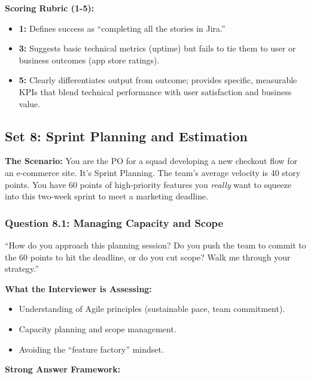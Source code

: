 \textbf{Scoring Rubric (1-5):}

\begin{itemize}
\tightlist
\item
  \textbf{1:} Defines success as ``completing all the stories in Jira.''
\item
  \textbf{3:} Suggests basic technical metrics (uptime) but fails to tie
  them to user or business outcomes (app store ratings).
\item
  \textbf{5:} Clearly differentiates output from outcome; provides
  specific, measurable KPIs that blend technical performance with user
  satisfaction and business value.
\end{itemize}

\bigskip

\subsection{Set 8: Sprint Planning and
Estimation}\label{set-8-sprint-planning-and-estimation}

\textbf{The Scenario:} You are the PO for a squad developing a new
checkout flow for an e-commerce site. It's Sprint Planning. The team's
average velocity is 40 story points. You have 60 points of high-priority
features you \emph{really} want to squeeze into this two-week sprint to
meet a marketing deadline.

\subsubsection{Question 8.1: Managing Capacity and
Scope}\label{question-8.1-managing-capacity-and-scope}

``How do you approach this planning session? Do you push the team to
commit to the 60 points to hit the deadline, or do you cut scope? Walk
me through your strategy.''

\textbf{What the Interviewer is Assessing:}

\begin{itemize}
\tightlist
\item
  Understanding of Agile principles (sustainable pace, team commitment).
\item
  Capacity planning and scope management.
\item
  Avoiding the ``feature factory'' mindset.
\end{itemize}

\textbf{Strong Answer Framework:}

